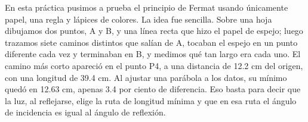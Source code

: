 En esta práctica pusimos a prueba el principio de Fermat usando únicamente papel, una regla y lápices de colores. La idea fue sencilla. Sobre una hoja dibujamos dos puntos, A y B, y una línea recta que hizo el papel de espejo; luego trazamos siete caminos distintos que salían de A, tocaban el espejo en un punto diferente cada vez y terminaban en B, y medimos qué tan largo era cada uno. El camino más corto apareció en el punto P4, a una distancia de 12.2 cm del origen, con una longitud de 39.4 cm. Al ajustar una parábola a los datos, su mínimo quedó en 12.63 cm, apenas 3.4 por ciento de diferencia. Eso basta para decir que la luz, al reflejarse, elige la ruta de longitud mínima y que en esa ruta el ángulo de incidencia es igual al ángulo de reflexión.
